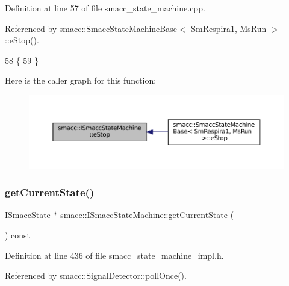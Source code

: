 Definition at line 57 of file smacc\+\_\+state\+\_\+machine.\+cpp.



Referenced by smacc\+::\+Smacc\+State\+Machine\+Base$<$ Sm\+Respira1, Ms\+Run $>$\+::e\+Stop().


\begin{DoxyCode}
58 \{
59 \}
\end{DoxyCode}
Here is the caller graph for this function\+:
\nopagebreak
\begin{figure}[H]
\begin{center}
\leavevmode
\includegraphics[width=350pt]{classsmacc_1_1ISmaccStateMachine_a66a2900be8629748dab7a5c5ab6ae94e_icgraph}
\end{center}
\end{figure}
\mbox{\label{classsmacc_1_1ISmaccStateMachine_a610d09dc5341fb63732be713c21fbe86}} 
\subsubsection{\texorpdfstring{get\+Current\+State()}{getCurrentState()}}
{\footnotesize\ttfamily \hyperlink{classsmacc_1_1ISmaccState}{I\+Smacc\+State} $\ast$ smacc\+::\+I\+Smacc\+State\+Machine\+::get\+Current\+State (\begin{DoxyParamCaption}{ }\end{DoxyParamCaption}) const\hspace{0.3cm}{\ttfamily [inline]}}



Definition at line 436 of file smacc\+\_\+state\+\_\+machine\+\_\+impl.\+h.



Referenced by smacc\+::\+Signal\+Detector\+::poll\+Once().


